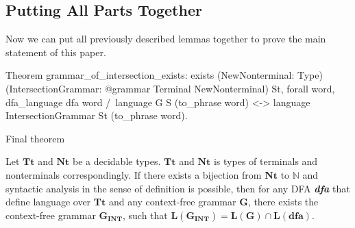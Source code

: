 \subsection{Putting All Parts Together}

Now we can put all previously described lemmas together to prove the main statement of this paper.

\begin{listing}[h]
   \begin{pyglist}[language=coq, numbers=none, numbersep=5pt]

Theorem grammar_of_intersection_exists:
 exists
  (NewNonterminal: Type)
  (IntersectionGrammar: @grammar Terminal NewNonterminal) St,
 forall word,
   dfa_language dfa word /\ language G S (to_phrase word) <->
   language IntersectionGrammar St (to_phrase word).
  \end{pyglist}
\caption{Final theorem}
\label{lst:lang-eq}
\end{listing}

\begin{theorem}
    Let $\boldsymbol{Tt}$ and $\boldsymbol{Nt}$ be a decidable types. $\boldsymbol{Tt}$ and $\boldsymbol{Nt}$ is types of terminals and nonterminals correspondingly.
    If there exists a bijection from $\boldsymbol{Nt}$ to $\mathbb{N}$ and syntactic analysis in the sense of definition is possible, then for any DFA \textbf{\textit{dfa}} that define language over $\boldsymbol{Tt}$ and any context-free grammar $\boldsymbol{G}$, there exists the context-free grammar $\boldsymbol{G_{INT}}$, such that $\boldsymbol{L}(\boldsymbol{G_{INT}}) = \boldsymbol{L}(\boldsymbol{G}) \cap \boldsymbol{L}(\textbf{dfa})$.
\end{theorem}
